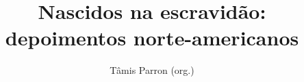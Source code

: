 \documentclass[11pt]{extarticle}
\begin{document}
\newcommand{\AutorLivro}{Tâmis Parron (org.)}
\newcommand{\TituloLivro}{Nascidos na escravidão: depoimentos norte-americanos}
\newcommand{\Tema}{Diálogos com a sociologia e com a antropologia}
\newcommand{\Genero}{Diário; biografia; autobiografia; relatos; memórias}
\newcommand{\imagemCapa}{./images/PNLD0007-01.png}
\newcommand{\issnppub}{978-65-89705-00-0}
\newcommand{\issnepub}{978-65-89705-03-1}
\newcommand{\colaborador}{Eduardo Modesto de Carvalho, 
      Bruno Gradella e Vicente Castro}


\title{\TituloLivro}
\author{\AutorLivro}
\def\authornotes{\colaborador}

\date{}
\maketitle
\end{document}
